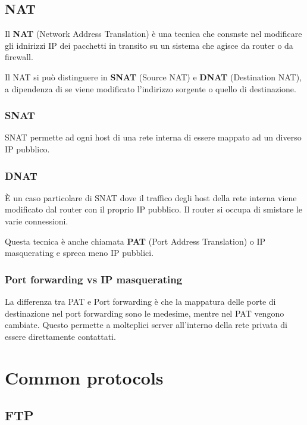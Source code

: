 \documentclass{article}
\begin{document}
\subsection{NAT}

Il \textbf{NAT} (Network Address Translation)
è una tecnica che consnste nel modificare gli idnirizzi IP dei pacchetti
in transito su un sistema che agisce da router o da firewall.

Il NAT si può distinguere in
\textbf{SNAT} (Source NAT) e \textbf{DNAT} (Destination NAT), a
dipendenza di se viene modificato l'indirizzo sorgente o quello
di destinazione.

\subsubsection{SNAT}

SNAT permette ad ogni host di una rete interna
di essere mappato ad un diverso IP pubblico.

\subsubsection{DNAT}

È un caso particolare di SNAT dove il traffico degli host della rete interna viene modificato dal
router con il proprio IP pubblico. Il router si occupa di smistare
le varie connessioni.

Questa tecnica è anche chiamata \textbf{PAT} (Port Address Translation)
 o IP masquerating e spreca meno IP pubblici.

\subsubsection{Port forwarding vs IP masquerating}

La differenza tra PAT e Port forwarding è che la mappatura
delle porte di destinazione nel port forwarding sono le medesime,
mentre nel PAT vengono cambiate. Questo permette a molteplici server
all'interno della rete privata di essere direttamente contattati.

\pagebreak

\section{Common protocols}

\subsection{FTP}
\end{document}
